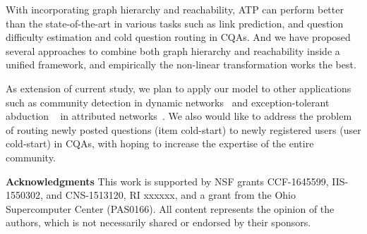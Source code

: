 \documentclass[letterpaper]{article} \usepackage{aaai19}  \usepackage{times}  \usepackage{helvet}  \usepackage{courier}  \usepackage{url}  \usepackage{graphicx}  \usepackage{booktabs} \usepackage{xcolor}
\begin{document}
With incorporating graph hierarchy and reachability, ATP can perform better than the state-of-the-art in various tasks such as link prediction, and question difficulty estimation and cold question routing in CQAs. And we have proposed several approaches to combine both graph hierarchy and reachability inside a unified framework, and empirically the non-linear transformation works the best.  


As extension of current study, we plan to apply our model to other applications such as community detection in dynamic networks~\cite{wang2018spread} and exception-tolerant abduction ~\cite{Zhang2017AAAI} in attributed networks~\cite{SEANO}. We also would like to address the problem of routing newly posted questions (item cold-start) to newly registered users (user cold-start) in CQAs, with hoping to increase the expertise of the entire community.

 {\bf Acknowledgments} This work is supported by NSF grants CCF-1645599, IIS-1550302, and CNS-1513120, RI xxxxxx, and a grant from the Ohio Supercomputer Center (PAS0166). All content represents the opinion of the authors, which is not necessarily shared or endorsed by their sponsors.





\end{document}
